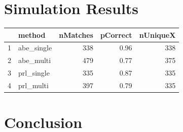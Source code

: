 \documentclass[12pt]{article}
\begin{document}
\section{Simulation Results}

\begin{table}[ht]
\centering
\begin{tabular}{rlrrr}
  \hline
 & method & nMatches & pCorrect & nUniqueX \\ 
  \hline
1 & abe\_single & 338 & 0.96 & 338 \\ 
  2 & abe\_multi & 479 & 0.77 & 375 \\ 
  3 & prl\_single & 335 & 0.87 & 335 \\ 
  4 & prl\_multi & 397 & 0.79 & 335 \\ 
   \hline
\end{tabular}
\end{table}

\section{Conclusion}

\newpage
\singlespacing
 

\end{document}

